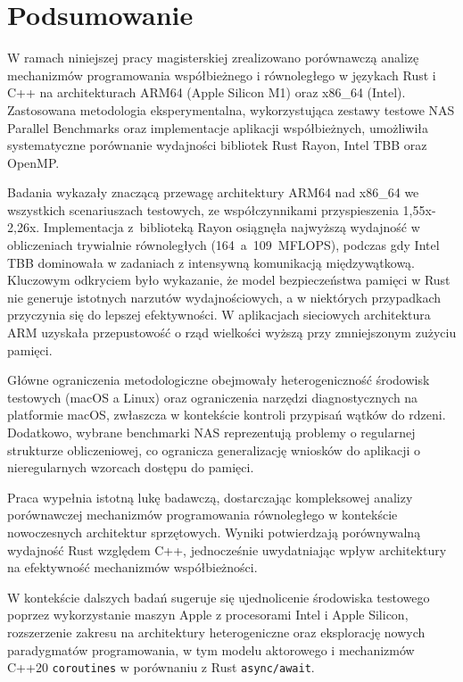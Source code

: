 \chapter{Podsumowanie}
W ramach niniejszej pracy magisterskiej zrealizowano porównawczą analizę mechanizmów programowania współbieżnego i równoległego w językach Rust i C++ na architekturach ARM64 (Apple Silicon M1) oraz x86\_64 (Intel). Zastosowana metodologia eksperymentalna, wykorzystująca zestawy testowe NAS Parallel Benchmarks oraz implementacje aplikacji współbieżnych, umożliwiła systematyczne porównanie wydajności bibliotek Rust Rayon, Intel TBB oraz OpenMP.

Badania wykazały znaczącą przewagę architektury ARM64 nad x86\_64 we wszystkich scenariuszach testowych, ze współczynnikami przyspieszenia 1,55x-2,26x. Implementacja z~biblioteką Rayon osiągnęła najwyższą wydajność w obliczeniach trywialnie równoległych \mbox{(164 a 109 MFLOPS)}, podczas gdy Intel TBB dominowała w zadaniach z intensywną komunikacją międzywątkową. Kluczowym odkryciem było wykazanie, że model bezpieczeństwa pamięci w Rust nie generuje istotnych narzutów wydajnościowych, a w niektórych przypadkach przyczynia się do lepszej efektywności. W aplikacjach sieciowych architektura ARM uzyskała przepustowość o rząd wielkości wyższą przy zmniejszonym zużyciu pamięci.

Główne ograniczenia metodologiczne obejmowały heterogeniczność środowisk testowych (macOS a Linux) oraz ograniczenia narzędzi diagnostycznych na platformie macOS, zwłaszcza w kontekście kontroli przypisań wątków do rdzeni. Dodatkowo, wybrane benchmarki NAS reprezentują problemy o regularnej strukturze obliczeniowej, co ogranicza generalizację wniosków do aplikacji o nieregularnych wzorcach dostępu do pamięci.

Praca wypełnia istotną lukę badawczą, dostarczając kompleksowej analizy porównawczej mechanizmów programowania równoległego w kontekście nowoczesnych architektur sprzętowych. Wyniki potwierdzają porównywalną wydajność Rust względem C++, jednocześnie uwydatniając wpływ architektury na efektywność mechanizmów współbieżności.

W kontekście dalszych badań sugeruje się ujednolicenie środowiska testowego poprzez wykorzystanie maszyn Apple z procesorami Intel i Apple Silicon, rozszerzenie zakresu na architektury heterogeniczne oraz eksplorację nowych paradygmatów programowania, w tym modelu aktorowego i mechanizmów C++20 \texttt{coroutines} w porównaniu z Rust \texttt{async/await}.

